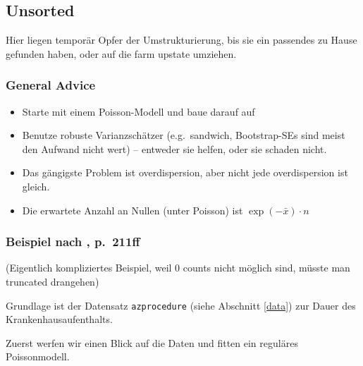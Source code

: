 \documentclass[ngerman,a4paper,]{scrartcl}
\newenvironment{Shaded}{\begin{snugshade}}{\end{snugshade}}
\newcommand{\DataTypeTok}[1]{\textcolor[rgb]{0.13,0.29,0.53}{#1}}
\newcommand{\KeywordTok}[1]{\textcolor[rgb]{0.13,0.29,0.53}{\textbf{#1}}}
\newcommand{\NormalTok}[1]{#1}
\newcommand{\OperatorTok}[1]{\textcolor[rgb]{0.81,0.36,0.00}{\textbf{#1}}}
\newcommand{\StringTok}[1]{\textcolor[rgb]{0.31,0.60,0.02}{#1}}
\providecommand{\tightlist}{%
  \setlength{\itemsep}{0pt}\setlength{\parskip}{0pt}}
\theoremstyle{definition}
\theoremstyle{definition}
\theoremstyle{definition}
\theoremstyle{remark}
\begin{document}
\hypertarget{unsorted}{%
\subsection{Unsorted}\label{unsorted}}

Hier liegen temporär Opfer der Umstrukturierung, bis sie ein passendes zu Hause gefunden haben, oder auf die farm upstate umziehen.

\hypertarget{general-advice}{%
\subsubsection{General Advice}\label{general-advice}}

\begin{itemize}
\tightlist
\item
  Starte mit einem Poisson-Modell und baue darauf auf
\item
  Benutze robuste Varianzschätzer (e.g.~sandwich, Bootstrap-SEs sind meist den Aufwand nicht wert) -- entweder sie helfen, oder sie schaden nicht.
\item
  Das gängigste Problem ist overdispersion, aber nicht jede overdispersion ist gleich.
\item
  Die erwartete Anzahl an Nullen (unter Poisson) ist \(\exp(-\bar{x}) \cdot n\)
\end{itemize}

\hypertarget{beispiel-nach-hilbemodelingcountdata2014-p.211ff}{%
\subsubsection{\texorpdfstring{Beispiel nach \citet{hilbeModelingCountData2014}, p.~211ff}{Beispiel nach @hilbeModelingCountData2014, p.~211ff}}\label{beispiel-nach-hilbemodelingcountdata2014-p.211ff}}

(Eigentlich kompliziertes Beispiel, weil 0 counts nicht möglich sind, müsste man truncated drangehen)

Grundlage ist der Datensatz \texttt{azprocedure} (siehe Abschnitt \ref{data}) zur Dauer des Krankenhausaufenthalts.

Zuerst werfen wir einen Blick auf die Daten und fitten ein reguläres Poissonmodell.

\begin{Shaded}
\end{Shaded}
\end{document}
